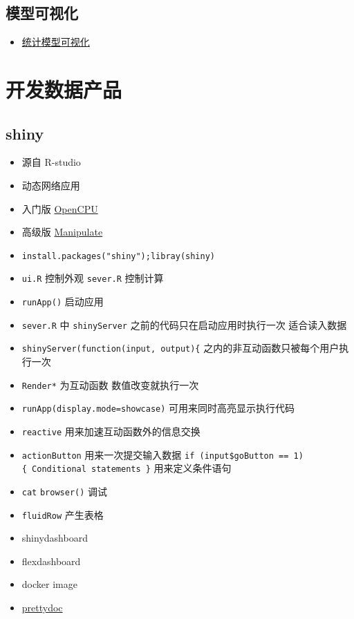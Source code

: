 \documentclass[]{book}
\providecommand{\tightlist}{%
  \setlength{\itemsep}{0pt}\setlength{\parskip}{0pt}}
\begin{document}
\section{模型可视化}

\begin{itemize}
\tightlist
\item
  \href{http://mfviz.com/hierarchical-models/}{统计模型可视化}
\end{itemize}

\chapter{开发数据产品}

\hypertarget{shiny}{%
\section{shiny}\label{shiny}}

\begin{itemize}
\tightlist
\item
  源自 R-studio
\item
  动态网络应用
\item
  入门版 \href{https://www.opencpu.org/}{OpenCPU}
\item
  高级版 \href{https://support.rstudio.com/hc/en-us/articles/200551906-Interactive-Plotting-with-Manipulate}{Manipulate}
\item
  \texttt{install.packages("shiny");libray(shiny)}
\item
  \texttt{ui.R} 控制外观 \texttt{sever.R} 控制计算
\item
  \texttt{runApp()} 启动应用
\item
  \texttt{sever.R} 中 \texttt{shinyServer} 之前的代码只在启动应用时执行一次 适合读入数据
\item
  \texttt{shinyServer(function(input,\ output)\{} 之内的非互动函数只被每个用户执行一次
\item
  \texttt{Render*} 为互动函数 数值改变就执行一次
\item
  \texttt{runApp(display.mode=\textquotesingle{}showcase\textquotesingle{})} 可用来同时高亮显示执行代码
\item
  \texttt{reactive} 用来加速互动函数外的信息交换
\item
  \texttt{actionButton} 用来一次提交输入数据 \texttt{if\ (input\$goButton\ ==\ 1)\{\ Conditional\ statements\ \}} 用来定义条件语句
\item
  \texttt{cat} \texttt{browser()} 调试
\item
  \texttt{fluidRow} 产生表格
\item
  shinydashboard
\item
  flexdashboard
\item
  docker image
\item
  \href{https://github.com/yixuan/prettydoc}{prettydoc}
\end{itemize}
\end{document}
